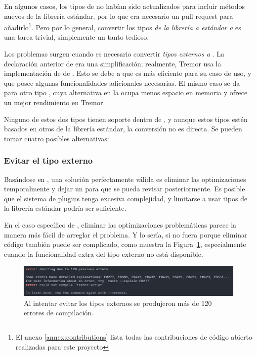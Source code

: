 En algunos casos, los tipos de \abistable no habían sido actualizados para
incluir métodos nuevos de la librería estándar, por lo que era necesario un pull
request para añadirlo\footnote{El anexo \ref{annex:contributions} lista todas
las contribuciones de código abierto realizadas para este proyecto}. Pero por lo
general, convertir los tipos \emph{de la librería a estándar a \abistable} es
una tarea trivial, simplemente un tanto tedioso.

Los problemas surgen cuando es necesario convertir \emph{tipos externos a
\abistable}. La declaración anterior de  era una simplificación;
realmente, Tremor usa la implementación de  de
. Esto se debe a que es más eficiente para su caso de uso, y
que posee algunas funcionalidades adicionales necesarias. El mismo caso se da
para otro tipo , cuya alternativa en la \crate {} ocupa
menos espacio en memoria y ofrece un mejor rendimiento en Tremor.

Ninguno de estos dos tipos tienen soporte dentro de \abistable, y aunque estos
tipos estén basados en otros de la librería estándar, la conversión no es
directa. Se pueden tomar cuatro posibles alternativas:

\subsubsection{Evitar el tipo externo}

Basándose en \work, una solución perfectamente válida es eliminar las
optimizaciones temporalmente y dejar un  para que se pueda revisar
posteriormente. Es posible que el sistema de plugins tenga excesiva complejidad,
y limitarse a usar tipos de la librería estándar podría ser suficiente.

En el caso específico de , eliminar las optimizaciones problemáticas
parece la manera más fácil de arreglar el problema. Y lo sería, si no fuera
porque eliminar código también puede ser complicado, como muestra la
Figura~\ref{fig:errors}, especialmente cuando la funcionalidad extra del tipo
externo no está disponible.

\begin{figure}
    \centering
    \includegraphics[width=\textwidth]{./Imagenes/errors.png}
    \caption{Al intentar evitar los tipos externos se produjeron más de 120
    errores de compilación.}%
    \label{fig:errors}
\end{figure}

